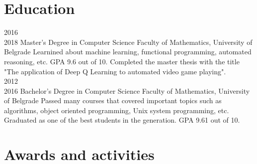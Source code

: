 \documentclass[a4paper]{my_cv}
\begin{document}
\section{Education}
\begin{entrylist}
  \entry
    {2016~\textemdash \\2018}
    {Master's Degree in Computer Science}
    {Faculty of Mathematics, University of Belgrade}
    {Learnined about machine learning, functional programming, automated reasoning, etc. GPA 9.6 out of 10. Completed the master thesis with the title "The application of Deep Q Learning to automated video game playing".}
    ~\\
  \entry
    {2012~\textemdash \\2016}
    {Bachelor's Degree in Computer Science}
    {Faculty of Mathematics, University of Belgrade}
    {Passed many courses that covered important topics such as algorithms, object oriented programming, Unix system programming, etc. Graduated as one of the best students in the generation. GPA 9.61 out of 10.}
\end{entrylist}

\section{Awards and activities}
\bodyfont
\begin{aplist}
\end{aplist}
\end{document}

